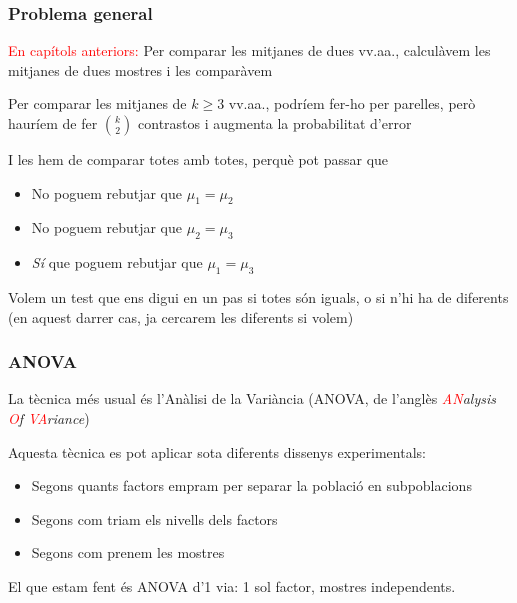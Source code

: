\documentclass[12pt,t]{beamer}
\newcommand{\red}[1]{\textcolor{red}{#1}}
\renewcommand{\emph}[1]{{\color{red}#1}}
\renewcommand{\geq}{\geqslant}
\theoremstyle{plain}
\theoremstyle{definition}
\begin{document}
\begin{frame}
\frametitle{Problema general}

\red{En capítols anteriors:} Per comparar les mitjanes de dues vv.aa.,  calculàvem les mitjanes de dues mostres i les comparàvem
\medskip

Per comparar les mitjanes de $k\geq 3$ vv.aa., podríem fer-ho per parelles, però hauríem de fer $\binom{k}{2}$ contrastos i augmenta la probabilitat d'error
\medskip

I les hem de comparar totes amb totes, perquè pot passar que
\begin{itemize}
\item No poguem rebutjar que $\mu_1= \mu_2$
\item No poguem rebutjar que $\mu_2= \mu_3$
\item \textit{Sí} que poguem rebutjar que $\mu_1= \mu_3$
\end{itemize}
\medskip

Volem un test que ens digui en un pas si totes són iguals, o si n'hi ha de diferents (en aquest darrer cas, ja cercarem les diferents si volem)
\end{frame}


\begin{frame}
\frametitle{ANOVA}

La tècnica més usual és l'\emph{Anàlisi de la Variància} (\emph{ANOVA}, de l'anglès \textsl{\red{AN}alysis \red{O}f \red{VA}riance})
\bigskip

Aquesta tècnica es pot aplicar sota diferents dissenys experimentals:\medskip

\begin{itemize}
\item Segons quants factors empram per separar la població en subpoblacions
\medskip

\item Segons com triam els nivells dels factors
\medskip

\item Segons com prenem les mostres
\end{itemize}
\medskip

El que estam fent és \emph{ANOVA d'1 via}: 1 sol factor, mostres independents.


\end{frame}
\end{document}
